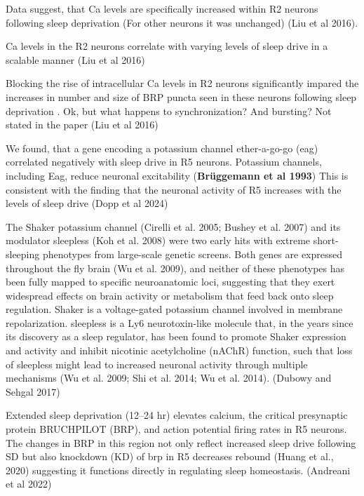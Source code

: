     Data suggest, that Ca levels are specifically increased within R2 neurons following sleep deprivation (For other neurons
    it was unchanged) \parencite{liuSleepDriveEncoded2016} (Liu et al 2016).

    Ca levels in the R2 neurons correlate with varying levels of sleep drive in a scalable manner \parencite{liuSleepDriveEncoded2016}
    (Liu et al 2016)

    Blocking the rise of intracellular Ca levels in R2 neurons significantly impared the increases in number and size of BRP puncta
    seen in these neurons following sleep deprivation \parencite{liuSleepDriveEncoded2016}.
    Ok, but what happens to synchronization? And bursting? Not stated in the paper
    (Liu et al 2016)

    We found, that a gene encoding a potassium channel ether-a-go-go (eag) correlated negatively with sleep drive in R5 neurons.
    Potassium channels, including Eag, reduce neuronal excitability (\textbf{Brüggemann et al 1993})
    This is consistent with the finding that the neuronal activity of R5 increases with the levels of sleep drive
    (Dopp et al 2024)

    The Shaker potassium channel (Cirelli et al. 2005; Bushey et al. 2007) and its modulator 
    sleepless (Koh et al. 2008) were two early hits with extreme short-sleeping phenotypes from 
    large-scale genetic screens. Both genes are expressed throughout the fly brain (Wu et al. 2009),
    and neither of these phenotypes has been fully mapped to specific neuroanatomic loci, suggesting
    that they exert widespread effects on brain activity or metabolism that feed back onto sleep 
    regulation. Shaker is a voltage-gated potassium channel involved in membrane repolarization.
    sleepless is a Ly6 neurotoxin-like molecule that, in the years since its discovery as a 
    sleep regulator, has been found to promote Shaker expression and activity and inhibit 
    nicotinic acetylcholine (nAChR) function, such that loss of sleepless might lead to 
    increased neuronal activity through multiple mechanisms 
    (Wu et al. 2009; Shi et al. 2014; Wu et al. 2014).
    \parencite{dubowyCircadianRhythmsSleep2017} (Dubowy and Sehgal 2017)

    Extended sleep deprivation (12–24 hr) elevates calcium, the critical presynaptic protein BRUCHPILOT (BRP), and action potential firing rates in R5 neurons. The changes in BRP in this region not only reflect increased sleep drive following SD but also knockdown (KD) of brp in R5 decreases rebound (Huang et al., 2020) suggesting it functions directly in regulating sleep homeostasis.
    \parencite{andreaniCircadianProgrammingEllipsoid2022} (Andreani et al 2022)

